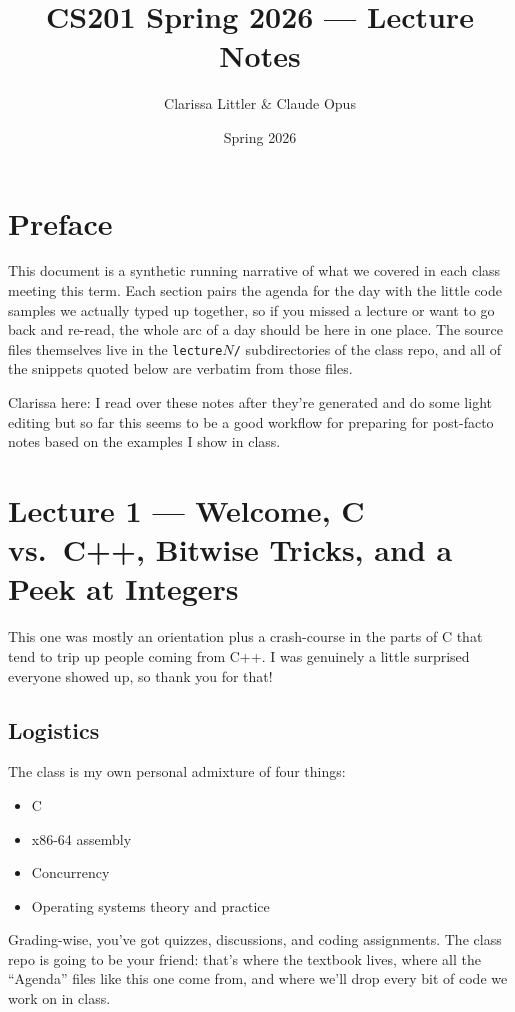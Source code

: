 \documentclass[11pt]{article}
\title{CS201 Spring 2026 --- Lecture Notes}
\author{Clarissa Littler \& Claude Opus}
\date{Spring 2026}
\begin{document}
\maketitle

\section*{Preface}

This document is a synthetic running narrative of what we covered in each class
meeting this term. Each section pairs the agenda for the day with the
little code samples we actually typed up together, so if you missed a
lecture or want to go back and re-read, the whole arc of a day should be
here in one place. The source files themselves live in the
\texttt{lecture$N$/} subdirectories of the class repo, and all of the
snippets quoted below are verbatim from those files.
\\
\begin{mdframed}
  Clarissa here: I read over these notes after they're generated and do some light editing but so far this seems to be a good workflow for preparing for post-facto notes based on the examples I show in class.
\end{mdframed}

\tableofcontents

\section{Lecture 1 --- Welcome, C vs.\ C++, Bitwise Tricks, and a Peek at Integers}

This one was mostly an orientation plus a crash-course in the parts of
C that tend to trip up people coming from C++. I was genuinely a little
surprised everyone showed up, so thank you for that!

\subsection*{Logistics}

The class is my own personal admixture of four things:
\begin{itemize}
  \item C
  \item x86-64 assembly
  \item Concurrency
  \item Operating systems theory and practice
\end{itemize}
Grading-wise, you've got quizzes, discussions, and coding assignments.
The class repo is going to be your friend: that's where the textbook
lives, where all the ``Agenda'' files like this one come from, and
where we'll drop every bit of code we work on in class.
\end{document}
